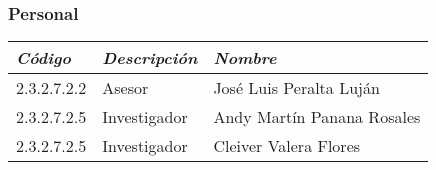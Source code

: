     \subsubsection{Personal}
        \begin{table}[h!]
            \centering
            \begin{tabular}{|p{3cm}|p{3cm}|p{5cm}|} \hline
                 
            
            \textit{{\bf{Código}}} &
            \textit{{\bf{Descripción}}} &
            \textit{{\bf{Nombre}}}
            \\ \hline

            2.3.2.7.2.2 &
            Asesor &
            José Luis Peralta Luján
            \\ \hline

            2.3.2.7.2.5 &
            Investigador &
            Andy Martín Panana Rosales
            \\ \hline

            2.3.2.7.2.5 &
            Investigador &
            Cleiver Valera Flores
            \\ \hline

            \end{tabular}
        \end{table}
